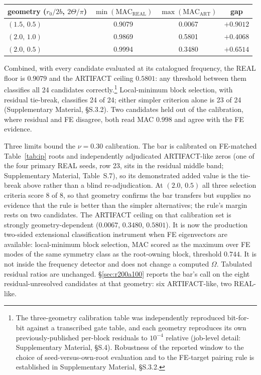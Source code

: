 \documentclass[11pt]{article}
\begin{document}
\begin{center}\footnotesize
\begin{tabular}{lccc}
\hline
geometry ($r_0/2b$, $2\Theta/\pi$) & $\min(\mathrm{MAC_{REAL}})$ &
$\max(\mathrm{MAC_{ART}})$ & gap \\
\hline
$(1.5,\,0.5)$ & 0.9079 & 0.0067 & $+0.9012$ \\
$(2.0,\,1.0)$ & 0.9869 & 0.5801 & $+0.4068$ \\
$(2.0,\,0.5)$ & 0.9994 & 0.3480 & $+0.6514$ \\
\hline
\end{tabular}
\end{center}

\noindent Combined, with every candidate evaluated at its catalogued
frequency, the REAL floor is $0.9079$ and the ARTIFACT ceiling $0.5801$:
any threshold between them classifies all 24 candidates
correctly.\footnote{The three-geometry calibration table was
independently reproduced bit-for-bit against a transcribed gate table,
and each geometry reproduces its own previously-published per-block
residuals to $10^{-4}$ relative (job-level detail: Supplementary
Material, §S.4). Robustness of the reported window to the choice of
seed-versus-own-root evaluation and to the FE-target pairing rule is
established in Supplementary Material, §S.3.2.}
Local-minimum block selection, with residual tie-break, classifies
24 of 24; either simpler criterion alone is 23 of 24
(Supplementary Material, §S.3.2). Two candidates held out of the
calibration, where residual and FE disagree, both read MAC $0.998$ and
agree with the FE evidence.

Three limits bound the $\nu=0.30$ calibration. The bar is calibrated on
FE-matched Table~\ref{tab:ip} roots and independently adjudicated
ARTIFACT-like zeros (one of the four primary REAL seeds, row 23, sits in
the residual middle band; Supplementary Material, Table~S.7), so its
demonstrated added value is the tie-break above rather than a blind
re-adjudication. At $(2.0,\,0.5)$ all three
selection criteria score 8 of 8, so that geometry confirms the bar
transfers but supplies no evidence that the rule is better than the
simpler alternatives; the rule's margin rests on two candidates.
The ARTIFACT ceiling on that calibration set is strongly
geometry-dependent ($0.0067$, $0.3480$, $0.5801$). It is now the production
two-sided extensional classification instrument when FE eigenvectors are
available: local-minimum block selection, MAC scored as the maximum
over FE modes of the same symmetry class as the root-owning block,
threshold $0.744$. It is not inside the frequency detector and does not
change a computed $\Omega$. Tabulated residual ratios are unchanged.
\S\ref{sec:r200a100} reports the bar's call on the eight
residual-unresolved candidates at that geometry: six ARTIFACT-like, two
REAL-like.
\end{document}
